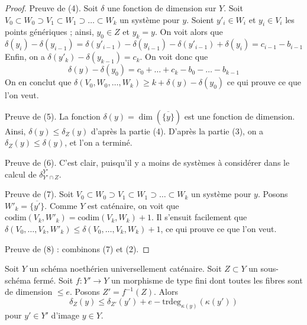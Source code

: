 \begin{proof}
\medskip\noindent
Preuve de (4). Soit $\delta$ une fonction de dimension sur $Y$.
Soit $V_0 \subset W_0 \supset V_1 \subset W_1 \supset \ldots \subset W_k$
un système pour $y$. Soient $y'_i \in W_i$ et $y_i \in V_i$ les
points génériques ; ainsi, $y_0 \in Z$ et $y_k = y$. On voit alors que
$$
\delta(y_i) - \delta(y_{i - 1}) =
\delta(y'_{i - 1}) - \delta(y_{i - 1}) - \delta(y'_{i - 1}) + \delta(y_i) =
c_{i - 1} - b_{i - 1}
$$
Enfin, on a $\delta(y'_k) - \delta(y_{k - 1}) = c_k$.
On voit donc que
$$
\delta(y) - \delta(y_0) =
c_0 + \ldots + c_k - b_0 - \ldots - b_{k - 1}
$$
On en conclut que
$\delta(V_0, W_0, \ldots, W_k) \geq k + \delta(y) - \delta(y_0)$
ce qui prouve ce que l'on veut.

\medskip\noindent
Preuve de (5). La fonction $\delta(y) = \dim(\overline{\{y\}})$
est une fonction de dimension. Ainsi, $\delta(y) \leq \delta_Z(y)$ d'après la
partie (4). D'après la partie (3), on a $\delta_Z(y) \leq \delta(y)$,
et l'on a terminé.

\medskip\noindent
Preuve de (6). C'est clair, puisqu'il y a moins de systèmes à considérer
dans le calcul de $\delta^{Y'}_{Y' \cap Z}$.

\medskip\noindent
Preuve de (7). Soit
$V_0 \subset W_0 \supset V_1 \subset W_1 \supset \ldots \subset W_k$
un système pour $y$. Posons $W'_k = \overline{\{y'\}}$.
Comme $Y$ est caténaire, on voit que
$\text{codim}(V_k, W'_k) = \text{codim}(V_k, W_k) + 1$.
Il s'ensuit facilement que $\delta(V_0, \ldots, V_k, W'_k) \leq
\delta(V_0, \ldots, V_k, W_k) + 1$, ce qui prouve ce que l'on veut.

\medskip\noindent
Preuve de (8) : combinons (7) et (2).
\end{proof}

\begin{lemma}
\label{lemma-change-distance-function}
Soit $Y$ un schéma noethérien universellement caténaire. Soit $Z \subset Y$
un sous-schéma fermé. Soit $f : Y' \to Y$ un morphisme de type fini
dont toutes les fibres sont de dimension $\leq e$. Posons $Z' = f^{-1}(Z)$.
Alors
$$
\delta_Z(y) \leq \delta_{Z'}(y') + e - \text{trdeg}_{\kappa(y)}(\kappa(y'))
$$
pour $y' \in Y'$ d'image $y \in Y$.
\end{lemma}

